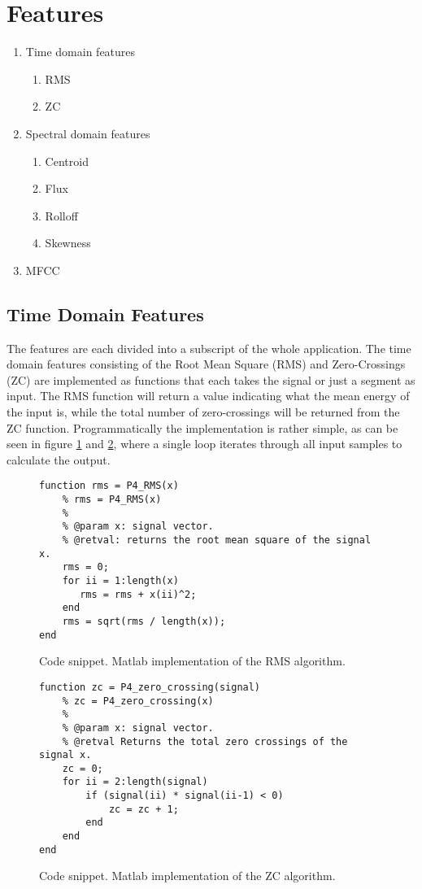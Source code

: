 \section{Features}

\begin{enumerate}
	\item Time domain features
	\begin{enumerate}
		\item RMS
		\item ZC
	\end{enumerate}
	\item Spectral domain features
	\begin{enumerate}
		\item Centroid
		\item Flux
		\item Rolloff
		\item Skewness
	\end{enumerate}
	\item MFCC
\end{enumerate}
\subsection{Time Domain Features}
The features are each divided into a subscript of the whole application. The time domain features consisting of the Root Mean Square (RMS) and Zero-Crossings (ZC) are implemented as functions that each takes the signal or just a segment as input. The RMS function will return a value indicating what the mean energy of the input is, while the total number of zero-crossings will be returned from the ZC function. Programmatically the implementation is rather simple, as can be seen in figure \ref{snippet-RMS} and \ref{snippet-ZC}, where a single loop iterates through all input samples to calculate the output.

\begin{figure}
\begin{lstlisting}
function rms = P4_RMS(x)
    % rms = P4_RMS(x)
    %
    % @param x: signal vector.
    % @retval: returns the root mean square of the signal x.
    rms = 0;
    for ii = 1:length(x)
       rms = rms + x(ii)^2; 
    end
    rms = sqrt(rms / length(x));
end
\end{lstlisting}
\caption{Code snippet. Matlab implementation of the RMS algorithm.}
\label{snippet-RMS}
\end{figure}

\begin{figure}
\begin{lstlisting}
function zc = P4_zero_crossing(signal)
    % zc = P4_zero_crossing(x)
    %
    % @param x: signal vector.
    % @retval Returns the total zero crossings of the signal x.
    zc = 0;
    for ii = 2:length(signal)
        if (signal(ii) * signal(ii-1) < 0)
            zc = zc + 1;
        end
    end
end
\end{lstlisting}
\caption{Code snippet. Matlab implementation of the ZC algorithm.}
\label{snippet-ZC}
\end{figure}

